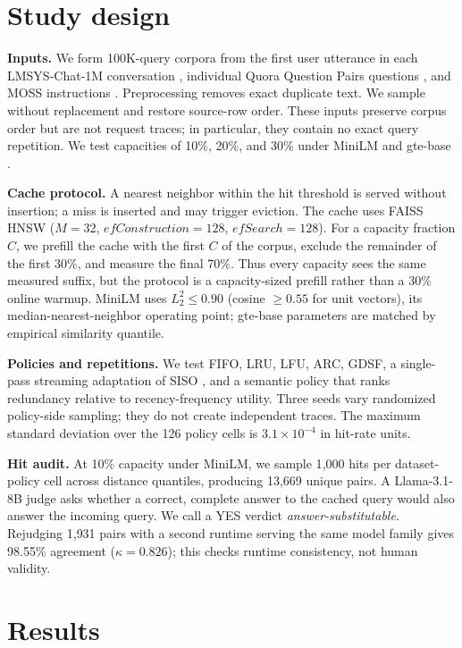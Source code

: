 \documentclass{article}
\begin{document}
\section{Study design}
\label{sec:design}
\textbf{Inputs.} We form 100K-query corpora from the first user utterance in
each LMSYS-Chat-1M conversation \citep{zheng2023lmsys}, individual Quora
Question Pairs questions \citep{iyer2017qqp}, and MOSS instructions
\citep{sun2024moss}. Preprocessing removes exact duplicate text. We sample
without replacement and restore source-row order. These inputs preserve corpus
order but are not request traces; in particular, they contain no exact query
repetition. We test capacities of 10\%, 20\%, and 30\% under MiniLM
\citep{reimers2019sbert} and gte-base \citep{li2023gte}.

\textbf{Cache protocol.} A nearest neighbor within the hit threshold is served
without insertion; a miss is inserted and may trigger eviction. The cache uses
FAISS HNSW ($M{=}32$, $\mathit{efConstruction}{=}128$,
$\mathit{efSearch}{=}128$). For a capacity fraction $C$, we prefill the cache
with the first $C$ of the corpus, exclude the remainder of the first 30\%, and
measure the final 70\%. Thus every capacity sees the same measured suffix, but
the protocol is a capacity-sized prefill rather than a 30\% online warmup.
MiniLM uses $L_2^2 \leq 0.90$ (cosine $\geq 0.55$ for unit vectors), its
median-nearest-neighbor operating point; gte-base parameters are matched by
empirical similarity quantile.

\textbf{Policies and repetitions.} We test FIFO, LRU, LFU, ARC, GDSF, a
single-pass streaming adaptation of SISO \citep{kim2025siso}, and a semantic
policy that ranks redundancy relative to recency-frequency utility. Three
seeds vary randomized policy-side sampling; they do not create independent
traces. The maximum standard deviation over the 126 policy cells is
$3.1\times10^{-4}$ in hit-rate units.

\textbf{Hit audit.} At 10\% capacity under MiniLM, we sample 1{,}000 hits per
dataset-policy cell across distance quantiles, producing 13{,}669 unique
pairs. A Llama-3.1-8B judge \citep{grattafiori2024llama} asks whether a
correct, complete answer to the cached query would also answer the incoming
query. We call a YES verdict \emph{answer-substitutable}. Rejudging 1{,}931
pairs with a second runtime serving the same model family gives 98.55\%
agreement ($\kappa=0.826$); this checks runtime consistency, not human
validity.

\section{Results}
\end{document}
